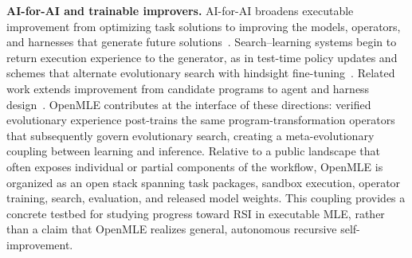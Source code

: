 \textbf{AI-for-AI and trainable improvers.}
AI-for-AI broadens executable improvement from optimizing task solutions to improving the models, operators, and harnesses that generate future solutions~\citep{jiang2026selfimprovingagents}.
Search--learning systems begin to return execution experience to the generator, as in test-time policy updates and schemes that alternate evolutionary search with hindsight fine-tuning~\citep{wang2025thetaevolve,yuksekgonul2026learning,pourcel2025soar}.
Related work extends improvement from candidate programs to agent and harness design~\citep{hu2024adas,zhang2026hyperagents,lee2026metaharness,zhang2026aevo}.
OpenMLE contributes at the interface of these directions: verified evolutionary experience post-trains the same program-transformation operators that subsequently govern evolutionary search, creating a meta-evolutionary coupling between learning and inference.
Relative to a public landscape that often exposes individual or partial components of the workflow, OpenMLE is organized as an open stack spanning task packages, sandbox execution, operator training, search, evaluation, and released model weights.
This coupling provides a concrete testbed for studying progress toward RSI in executable MLE, rather than a claim that OpenMLE realizes general, autonomous recursive self-improvement.
